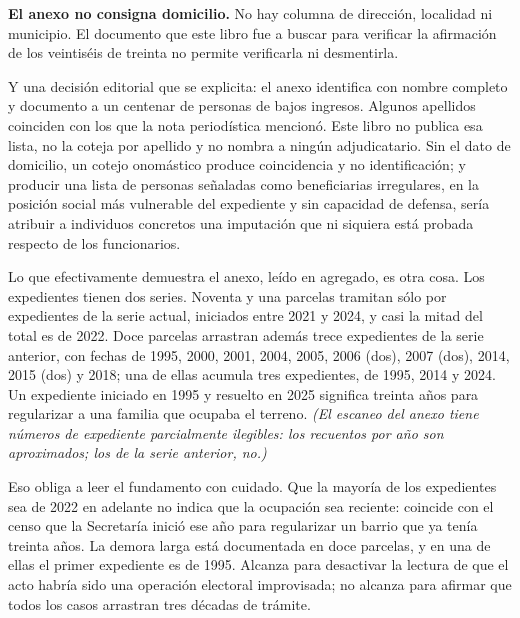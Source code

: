 \begin{cautela}
\textbf{El anexo no consigna domicilio.} No hay columna de dirección, localidad ni municipio. El documento que este libro fue a buscar para verificar la afirmación de los veintiséis de treinta no permite verificarla ni desmentirla.

Y una decisión editorial que se explicita: el anexo identifica con nombre completo y documento a un centenar de personas de bajos ingresos. Algunos apellidos coinciden con los que la nota periodística mencionó. Este libro no publica esa lista, no la coteja por apellido y no nombra a ningún adjudicatario. Sin el dato de domicilio, un cotejo onomástico produce coincidencia y no identificación; y producir una lista de personas señaladas como beneficiarias irregulares, en la posición social más vulnerable del expediente y sin capacidad de defensa, sería atribuir a individuos concretos una imputación que ni siquiera está probada respecto de los funcionarios.

Lo que efectivamente demuestra el anexo, leído en agregado, es otra cosa. Los expedientes tienen dos series. Noventa y una parcelas tramitan sólo por expedientes de la serie actual, iniciados entre 2021 y 2024, y casi la mitad del total es de 2022. Doce parcelas arrastran además trece expedientes de la serie anterior, con fechas de 1995, 2000, 2001, 2004, 2005, 2006 (dos), 2007 (dos), 2014, 2015 (dos) y 2018; una de ellas acumula tres expedientes, de 1995, 2014 y 2024. Un expediente iniciado en 1995 y resuelto en 2025 significa treinta años para regularizar a una familia que ocupaba el terreno. \textit{(El escaneo del anexo tiene números de expediente parcialmente ilegibles: los recuentos por año son aproximados; los de la serie anterior, no.)}

Eso obliga a leer el fundamento con cuidado. Que la mayoría de los expedientes sea de 2022 en adelante no indica que la ocupación sea reciente: coincide con el censo que la Secretaría inició ese año para regularizar un barrio que ya tenía treinta años. La demora larga está documentada en doce parcelas, y en una de ellas el primer expediente es de 1995. Alcanza para desactivar la lectura de que el acto habría sido una operación electoral improvisada; no alcanza para afirmar que todos los casos arrastran tres décadas de trámite.


\end{cautela}
